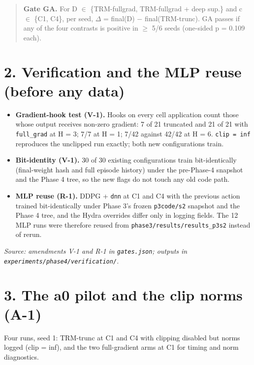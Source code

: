 \documentclass[11pt]{article}
\begin{document}
\begin{quote}\textbf{Gate GA.} For D $\in$ \{TRM-fullgrad, TRM-fullgrad + deep sup.\} and c $\in$ \{C1, C4\}, per seed, $\Delta$ = final(D) $-$ final(TRM-trunc). GA passes if any of the four contrasts is positive in $\geq$ 5/6 seeds (one-sided p = 0.109 each).\end{quote}



\section*{2. Verification and the MLP reuse (before any data)}



\begin{itemize}
\item \textbf{Gradient-hook test (V-1).} Hooks on every cell application count those whose output receives non-zero gradient: 7 of 21 truncated and 21 of 21 with \texttt{full\_grad} at H = 3; 7/7 at H = 1; 7/42 against 42/42 at H = 6. \texttt{clip = inf} reproduces the unclipped run exactly; both new configurations train.
\item \textbf{Bit-identity (V-1).} 30 of 30 existing configurations train bit-identically (final-weight hash and full episode history) under the pre-Phase-4 snapshot and the Phase 4 tree, so the new flags do not touch any old code path.
\item \textbf{MLP reuse (R-1).} DDPG + \texttt{dnn} at C1 and C4 with the previous action trained bit-identically under Phase 3's frozen \texttt{p3code/s2} snapshot and the Phase 4 tree, and the Hydra overrides differ only in logging fields. The 12 MLP runs were therefore reused from \texttt{phase3/\allowbreak{}results/\allowbreak{}results\_\allowbreak{}p3s2} instead of rerun.
\end{itemize}



\emph{Source: amendments V-1 and R-1 in \texttt{gates.json}; outputs in \texttt{experiments/\allowbreak{}phase4/\allowbreak{}verification/\allowbreak{}}.}



\section*{3. The a0 pilot and the clip norms (A-1)}



Four runs, seed 1: TRM-trunc at C1 and C4 with clipping disabled but norms logged (clip = inf), and the two full-gradient arms at C1 for timing and norm diagnostics.
\end{document}
